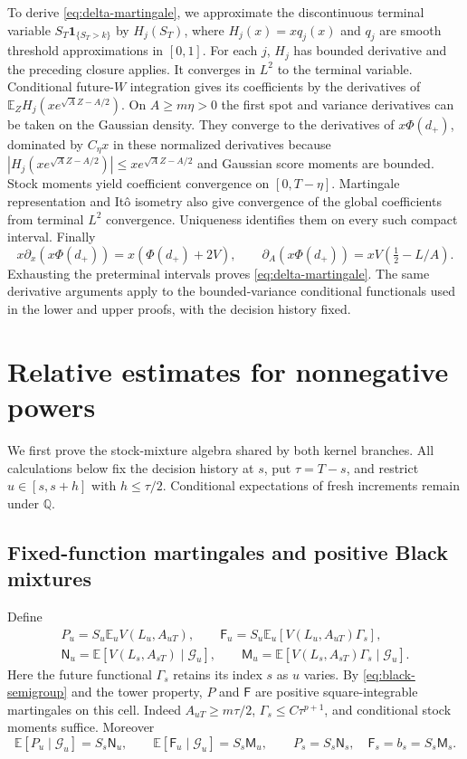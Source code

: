 \documentclass[11pt,a4paper]{amsart}
\theoremstyle{plain}
\theoremstyle{definition}
\theoremstyle{remark}
\newcommand{\EE}{\mathbb{E}}
\newcommand{\QQ}{\mathbb{Q}}
\newcommand{\G}{\mathcal G}
\begin{document}
To derive \eqref{eq:delta-martingale}, we approximate the discontinuous terminal variable $S_T\mathbf1_{\{S_T>k\}}$ by $H_j(S_T)$, where $H_j(x)=xq_j(x)$ and $q_j$ are smooth threshold approximations in $[0,1]$. For each $j$, $H_j$ has bounded derivative and the preceding closure applies. It converges in $L^2$ to the terminal variable. Conditional future-$W$ integration gives its coefficients by the derivatives of
$\EE_ZH_j(xe^{\sqrt A Z-A/2})$. On $A\ge m\eta>0$ the first spot and variance derivatives can be taken on the Gaussian density. They converge to the derivatives of $x\Phi(d_+)$, dominated by $C_\eta x$ in these normalized derivatives because $|H_j(xe^{\sqrt A Z-A/2})|\le xe^{\sqrt A Z-A/2}$ and Gaussian score moments are bounded. Stock moments yield coefficient convergence on $[0,T-\eta]$. Martingale representation and It\^o isometry also give convergence of the global coefficients from terminal $L^2$ convergence. Uniqueness identifies them on every such compact interval. Finally
\[
 x\partial_x(x\Phi(d_+))=x(\Phi(d_+)+2V),\qquad
 \partial_A(x\Phi(d_+))=xV(\tfrac12-L/A).
\]
Exhausting the preterminal intervals proves \eqref{eq:delta-martingale}. The same derivative arguments apply to the bounded-variance conditional functionals used in the lower and upper proofs, with the decision history fixed.

\section{Relative estimates for nonnegative powers}\label{app:nonnegative}

We first prove the stock-mixture algebra shared by both kernel branches. All calculations below fix the decision history at $s$, put $\tau=T-s$, and restrict $u\in[s,s+h]$ with $h\le\tau/2$. Conditional expectations of fresh increments remain under $\QQ$.

\subsection{Fixed-function martingales and positive Black mixtures}\label{subsec:mixture}
Define
\begin{equation}\label{eq:fixed-martingales}
 \begin{gathered}
 P_u=S_u\EE_uV(L_u,A_{uT}),\qquad
 \mathsf F_u=S_u\EE_u[V(L_u,A_{uT})\Gamma_s],\\
 \mathsf N_u=\EE[V(L_s,A_{sT})\mid\G_u],\qquad
 \mathsf M_u=\EE[V(L_s,A_{sT})\Gamma_s\mid\G_u].
 \end{gathered}
\end{equation}
Here the future functional $\Gamma_s$ retains its index $s$ as $u$ varies. By \eqref{eq:black-semigroup} and the tower property, $P$ and $\mathsf F$ are positive square-integrable martingales on this cell. Indeed $A_{uT}\ge m\tau/2$, $\Gamma_s\le C\tau^{p+1}$, and conditional stock moments suffice. Moreover
\begin{equation}\label{eq:fixed-means}
 \EE[P_u\mid\G_u]=S_s\mathsf N_u,\qquad
 \EE[\mathsf F_u\mid\G_u]=S_s\mathsf M_u,\qquad
 P_s=S_s\mathsf N_s,\quad \mathsf F_s=b_s=S_s\mathsf M_s.
\end{equation}
\end{document}
